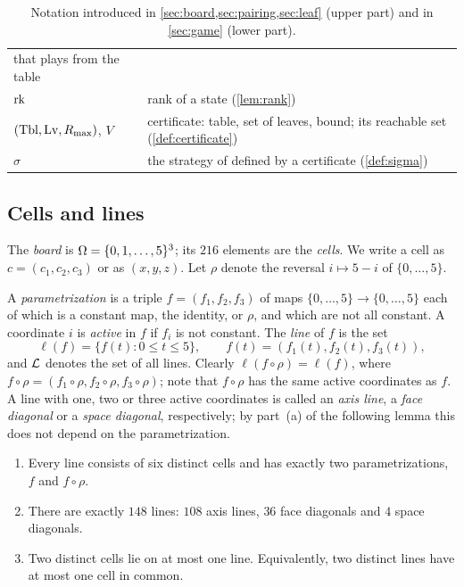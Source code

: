 \begin{table}[t]
\begin{tabular}{@{}lp{}@{}}
      that \Breaker{} plays from the table \\
$\operatorname{rk}$ & rank of a state (\cref{lem:rank}) \\
$(\mathrm{Tbl},\mathrm{Lv},R_{\max})$, $V$ & certificate: table, set of leaves, bound; its reachable set
      (\cref{def:certificate}) \\
$\sigma$ & the strategy of \Breaker{} defined by a certificate (\cref{def:sigma}) \\
\bottomrule
\end{tabular}
\caption{Notation introduced in \cref{sec:board,sec:pairing,sec:leaf} (upper part) and in \cref{sec:game}
(lower part).}
\label{tab:notation}
\end{table}

\subsection{Cells and lines}\label{ssec:lines}

The \emph{board} is $\Omega=\{0,1,\dots,5\}^3$; its $216$ elements are the \emph{cells}. We write a cell as
$c=(c_1,c_2,c_3)$ or as $(x,y,z)$. Let $\rho$ denote the reversal $i\mapsto 5-i$ of $\{0,\dots,5\}$.

A \emph{parametrization} is a triple $f=(f_1,f_2,f_3)$ of maps $\{0,\dots,5\}\to\{0,\dots,5\}$ each of which
is a constant map, the identity, or $\rho$, and which are not all constant. A coordinate $i$ is
\emph{active} in $f$ if $f_i$ is not constant. The \emph{line} of $f$ is the set
\[
  \ell(f)=\{f(t) : 0\le t\le 5\},\qquad f(t)=(f_1(t),f_2(t),f_3(t)),
\]
and $\mathcal{L}$ denotes the set of all lines. Clearly $\ell(f\circ\rho)=\ell(f)$, where
$f\circ\rho=(f_1\circ\rho,f_2\circ\rho,f_3\circ\rho)$; note that $f\circ\rho$ has the same active coordinates
as $f$. A line with one, two or three active coordinates is called an \emph{axis line}, a \emph{face
diagonal} or a \emph{space diagonal}, respectively; by part~(a) of the following lemma this does not
depend on the parametrization.

\begin{lemma}\label{lem:geometry}
\begin{enumerate}[label=\textup{(\alph*)}]
\item Every line consists of six distinct cells and has exactly two parametrizations, $f$ and $f\circ\rho$.
\item There are exactly $148$ lines: $108$ axis lines, $36$ face diagonals and $4$ space diagonals.
\item Two distinct cells lie on at most one line. Equivalently, two distinct lines have at most one cell in
      common.
\end{enumerate}
\end{lemma}

